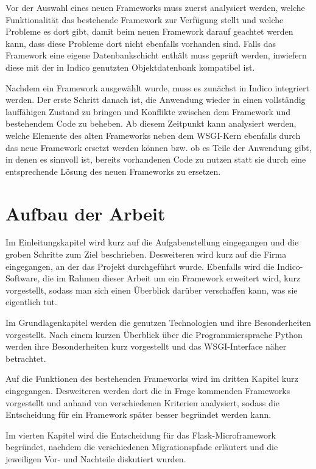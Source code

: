 Vor der Auswahl eines neuen Frameworks muss zuerst analysiert werden, welche Funktionalität das
bestehende Framework zur Verfügung stellt und welche Probleme es dort gibt, damit beim neuen
Framework darauf geachtet werden kann, dass diese Probleme dort nicht ebenfalls vorhanden sind.
Falls das Framework eine eigene Datenbankschicht enthält muss geprüft werden, inwiefern diese mit
der in Indico genutzten Objektdatenbank kompatibel ist.

Nachdem ein Framework ausgewählt wurde, muss es zunächst in Indico integriert werden. Der erste
Schritt danach ist, die Anwendung wieder in einen vollständig lauffähigen Zustand zu bringen und
Konflikte zwischen dem Framework und bestehendem Code zu beheben. Ab diesem Zeitpunkt kann
analysiert werden, welche Elemente des alten Frameworks neben dem WSGI-Kern ebenfalls durch das neue
Framework ersetzt werden können bzw. ob es Teile der Anwendung gibt, in denen es sinnvoll ist,
bereits vorhandenen Code zu nutzen statt sie durch eine entsprechende Lösung des neuen Frameworks zu
ersetzen.


\section{Aufbau der Arbeit}

Im Einleitungskapitel wird kurz auf die Aufgabenstellung eingegangen und die groben Schritte zum
Ziel beschrieben. Desweiteren wird kurz auf die Firma eingegangen, an der das Projekt durchgeführt
wurde.
Ebenfalls wird die Indico-Software, die im Rahmen dieser Arbeit um ein Framework erweitert wird,
kurz vorgestellt, sodass man sich einen Überblick darüber verschaffen kann, was sie eigentlich tut.

Im Grundlagenkapitel werden die genutzen Technologien und ihre Besonderheiten vorgestellt. Nach
einem kurzen Überblick über die Programmiersprache Python werden ihre Besonderheiten kurz
vorgestellt und das WSGI-Interface näher betrachtet.

Auf die Funktionen des bestehenden Frameworks wird im dritten Kapitel kurz eingegangen. Desweiteren
werden dort die in Frage kommenden Frameworks vorgestellt und anhand von verschiedenen Kriterien
analysiert, sodass die Entscheidung für ein Framework später besser begründet werden kann.

Im vierten Kapitel wird die Entscheidung für das Flask-Microframework begründet, nachdem die
verschiedenen Migrationspfade erläutert und die jeweiligen Vor- und Nachteile diskutiert wurden.

